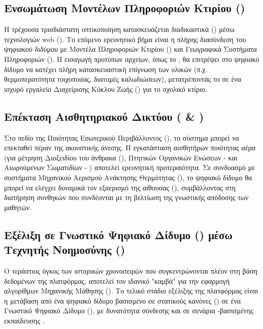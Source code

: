 \subsection{Ενσωμάτωση Μοντέλων Πληροφοριών Κτιρίου ()}
Η τρέχουσα τρισδιάστατη οπτικοποίηση κατασκευάζεται διαδικαστικά () μέσω τεχνολογιών web (). Το επόμενο ερευνητικό βήμα είναι η πλήρης διασύνδεση του ψηφιακού διδύμου με Μοντέλα Πληροφοριών Κτιρίου () και Γεωγραφικά Συστήματα Πληροφοριών (). Η εισαγωγή προτύπων αρχείων, όπως το , θα επιτρέψει στο ψηφιακό δίδυμο να κατέχει πλήρη κατασκευαστική επίγνωση των υλικών (π.χ. θερμοπερατότητα τοιχοποιίας, διατομές καλωδιώσεων), μετατρέποντάς το σε ένα ισχυρό εργαλείο Διαχείρισης Κύκλου Ζωής () για το σχολικό κτίριο.

\subsection{Επέκταση Αισθητηριακού Δικτύου ( \& )}
Στο πεδίο της Ποιότητας Εσωτερικού Περιβάλλοντος (), το σύστημα μπορεί να επεκταθεί πέραν της ακουστικής άνεσης. Η εγκατάσταση αισθητήρων ποιότητας αέρα (για μέτρηση Διοξειδίου του άνθρακα (), Πτητικών Οργανικών Ενώσεων -  και Αιωρούμενων Σωματιδίων - ) αποτελεί ερευνητική προτεραιότητα. Σε συνδυασμό με συστήματα Μηχανικού Αερισμού Ανάκτησης Θερμότητας (), το ψηφιακό δίδυμο θα μπορεί να ελέγχει δυναμικά τον εξαερισμό της αίθουσας (), συμβάλλοντας στη διατήρηση συνθηκών που συνδέονται με τη βελτίωση της γνωστικής απόδοσης των μαθητών.

\subsection{Εξέλιξη σε Γνωστικό Ψηφιακό Δίδυμο () μέσω Τεχνητής Νοημοσύνης ()}
Ο τεράστιος όγκος των ιστορικών χρονοσειρών που συγκεντρώνονται πλέον στη βάση δεδομένων  της πλατφόρμας, αποτελεί τον ιδανικό "καμβά" για την εφαρμογή αλγορίθμων Μηχανικής Μάθησης (). Το τελικό στάδιο εξέλιξης της πλατφόρμας είναι η μετάβαση από ένα ψηφιακό δίδυμο βασισμένο σε στατικούς κανόνες () σε ένα Γνωστικό Ψηφιακό Δίδυμο (), με δυνατότητα σύνδεσης και σε σενάρια -βασισμένης εκπαίδευσης \cite{Li2024}.

